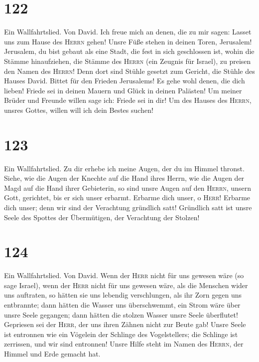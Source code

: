 \hypertarget{section-121}{%
\section{122}\label{section-121}}

 Ein Wallfahrtslied. Von David. Ich freue mich an denen,
die zu mir sagen: Lasset uns zum Hause des \textsc{Herrn} gehen!
 Unsre Füße stehen in deinen Toren, Jerusalem!
 Jerusalem, du bist gebaut als eine Stadt, die fest in
sich geschlossen ist,  wohin die Stämme hinaufziehen, die
Stämme des \textsc{Herrn} (ein Zeugnis für Israel), zu preisen den Namen
des \textsc{Herrn}!  Denn dort sind Stühle gesetzt zum
Gericht, die Stühle des Hauses David.  Bittet für den
Frieden Jerusalems! Es gehe wohl denen, die dich lieben! 
Friede sei in deinen Mauern und Glück in deinen Palästen! 
Um meiner Brüder und Freunde willen sage ich: Friede sei in dir!
 Um des Hauses des \textsc{Herrn}, unsres Gottes, willen
will ich dein Bestes suchen!

\hypertarget{section-122}{%
\section{123}\label{section-122}}

 Ein Wallfahrtslied. Zu dir erhebe ich meine Augen, der du
im Himmel thronst.  Siehe, wie die Augen der Knechte auf
die Hand ihres Herrn, wie die Augen der Magd auf die Hand ihrer
Gebieterin, so sind unsre Augen auf den \textsc{Herrn}, unsern Gott,
gerichtet, bis er sich unser erbarmt.  Erbarme dich unser,
o \textsc{Herr}! Erbarme dich unser; denn wir sind der Verachtung
gründlich satt!  Gründlich satt ist unsre Seele des
Spottes der Übermütigen, der Verachtung der Stolzen!

\hypertarget{section-123}{%
\section{124}\label{section-123}}

 Ein Wallfahrtslied. Von David. Wenn der \textsc{Herr}
nicht für uns gewesen wäre (so sage Israel),  wenn der
\textsc{Herr} nicht für uns gewesen wäre, als die Menschen wider uns
auftraten,  so hätten sie uns lebendig verschlungen, als
ihr Zorn gegen uns entbrannte;  dann hätten die Wasser uns
überschwemmt, ein Strom wäre über unsre Seele gegangen; 
dann hätten die stolzen Wasser unsre Seele überflutet! 
Gepriesen sei der \textsc{Herr}, der uns ihren Zähnen nicht zur Beute
gab!  Unsre Seele ist entronnen wie ein Vögelein der
Schlinge des Vogelstellers; die Schlinge ist zerrissen, und wir sind
entronnen!  Unsre Hilfe steht im Namen des \textsc{Herrn},
der Himmel und Erde gemacht hat.

